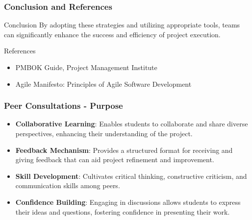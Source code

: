 \documentclass[aspectratio=169]{beamer}
\begin{document}
\begin{frame}[fragile]
  \frametitle{Conclusion and References}
  \begin{block}{Conclusion}
    By adopting these strategies and utilizing appropriate tools, teams can significantly enhance the success and efficiency of project execution.
  \end{block}

  \begin{block}{References}
    \begin{itemize}
      \item PMBOK Guide, Project Management Institute
      \item Agile Manifesto: Principles of Agile Software Development
    \end{itemize}
  \end{block}
\end{frame}

\begin{frame}[fragile]
    \frametitle{Peer Consultations - Purpose}
    
    \begin{itemize}
        \item \textbf{Collaborative Learning}: Enables students to collaborate and share diverse perspectives, enhancing their understanding of the project.
        \item \textbf{Feedback Mechanism}: Provides a structured format for receiving and giving feedback that can aid project refinement and improvement.
        \item \textbf{Skill Development}: Cultivates critical thinking, constructive criticism, and communication skills among peers.
        \item \textbf{Confidence Building}: Engaging in discussions allows students to express their ideas and questions, fostering confidence in presenting their work.
    \end{itemize}
\end{frame}
\end{document}
